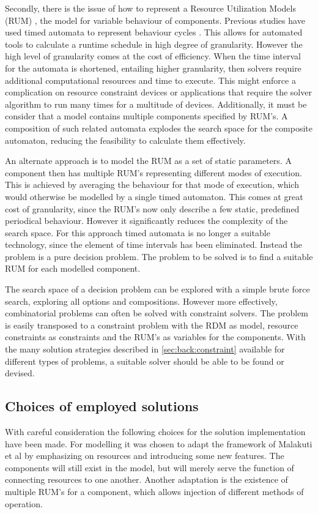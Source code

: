 Secondly, there is the issue of how to represent a Resource Utilization Models (RUM) \cite{steven_te_brinke}, the model for variable behaviour of components. Previous studies have used timed automata to represent behaviour cycles \cite{rum_basis_89, steven_te_brinke}. This allows for automated tools to calculate a runtime schedule in high degree of granularity. However the high level of granularity comes at the cost of efficiency. When the time interval for the automata is shortened, entailing higher granularity, then solvers require additional computational resources and time to execute. This might enforce a complication on resource constraint devices or applications that require the solver algorithm to run many times for a multitude of devices. Additionally, it must be consider that a model contains multiple components specified by RUM's. A composition of such related automata explodes the search space for the composite automaton, reducing the feasibility to calculate them effectively.

An alternate approach is to model the RUM as a set of static parameters. A component then has multiple RUM's representing different modes of execution. This is achieved by averaging the behaviour for that mode of execution, which would otherwise be modelled by a single timed automaton. This comes at great cost of granularity, since the RUM's now only describe a few static, predefined periodical behaviour. However it significantly reduces the complexity of the search space. For this approach timed automata is no longer a suitable technology, since the element of time intervals has been eliminated. Instead the problem is a pure decision problem. The problem to be solved is to find a suitable RUM for each modelled component. 

The search space of a decision problem can be explored with a simple brute force search, exploring all options and compositions. However more effectively, combinatorial problems can often be solved with constraint solvers. The problem is easily transposed to a constraint problem with the RDM as model, resource constraints as constraints and the RUM's as variables for the components. With the many solution strategies described in \ref{sec:back:constraint} available for different types of problems, a suitable solver should be able to be found or devised.

\subsection{Choices of employed solutions}
\label{sub:choices}
With careful consideration the following choices for the solution implementation have been made. For modelling it was chosen to adapt the framework of Malakuti et al \cite{steven_te_brinke} by emphasizing on resources and introducing some new features. The components will still exist in the model, but will merely serve the function of connecting resources to one another. Another adaptation is the existence of multiple RUM's for a component, which allows injection of different methods of operation.

